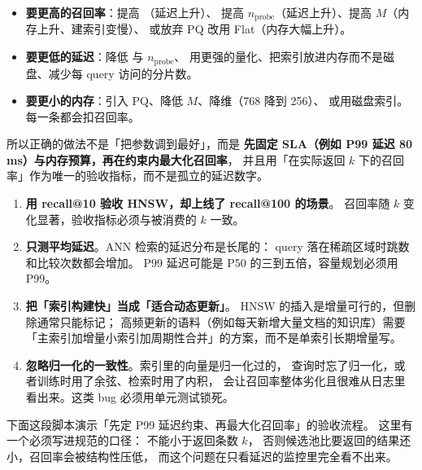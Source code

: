 \begin{keypoint}[三角关系与旋钮映射]
\begin{itemize}
  \item \textbf{要更高的召回率}：提高 （延迟上升）、
        提高 $n_{\text{probe}}$（延迟上升）、提高 $M$（内存上升、建索引变慢）、
        或放弃 PQ 改用 Flat（内存大幅上升）。
  \item \textbf{要更低的延迟}：降低  与 $n_{\text{probe}}$、
        用更强的量化、把索引放进内存而不是磁盘、减少每 query 访问的分片数。
  \item \textbf{要更小的内存}：引入 PQ、降低 $M$、降维（768 降到 256）、
        或用磁盘索引。每一条都会扣召回率。
\end{itemize}
所以正确的做法不是「把参数调到最好」，而是
\textbf{先固定 SLA（例如 P99 延迟 80\,ms）与内存预算，再在约束内最大化召回率}，
并且用「在实际返回 $k$ 下的召回率」作为唯一的验收指标，而不是孤立的延迟数字。
\end{keypoint}

\begin{pitfall}[向量索引的四个常见误判]
\begin{enumerate}
  \item \textbf{用 recall@10 验收 HNSW，却上线了 recall@100 的场景}。
        召回率随 $k$ 变化显著，验收指标必须与被消费的 $k$ 一致。
  \item \textbf{只测平均延迟}。ANN 检索的延迟分布是长尾的：
        query 落在稀疏区域时跳数和比较次数都会增加。
        P99 延迟可能是 P50 的三到五倍，容量规划必须用 P99。
  \item \textbf{把「索引构建快」当成「适合动态更新」}。
        HNSW 的插入是增量可行的，但删除通常只能标记；
        高频更新的语料（例如每天新增大量文档的知识库）需要
        「主索引加增量小索引加周期性合并」的方案，而不是单索引长期增量写。
  \item \textbf{忽略归一化的一致性}。索引里的向量是归一化过的，
        查询时忘了归一化，或者训练时用了余弦、检索时用了内积，
        会让召回率整体劣化且很难从日志里看出来。这类 bug 必须用单元测试锁死。
\end{enumerate}
\end{pitfall}

下面这段脚本演示「先定 P99 延迟约束、再最大化召回率」的验收流程。
这里有一个必须写进规范的口径： 不能小于返回条数 $k$，
否则候选池比要返回的结果还小，召回率会被结构性压低，
而这个问题在只看延迟的监控里完全看不出来。

